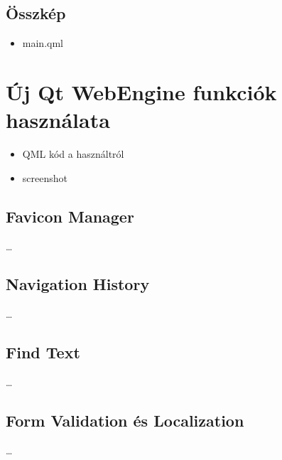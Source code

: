 \documentclass[12pt]{report}
\begin{document}
\subsection{Összkép}
\begin{itemize}
    \item main.qml
\end{itemize}


\section{Új Qt WebEngine funkciók használata}
\begin{itemize}
    \item QML kód a használtról
    \item screenshot
\end{itemize}

\subsection{Favicon Manager}
\dots

\subsection{Navigation History}
\dots

\subsection{Find Text}
\dots

\subsection{Form Validation és Localization}
\dots


\end{document}
